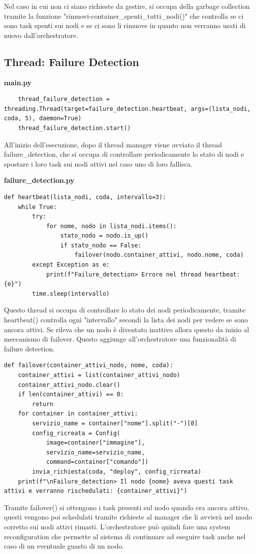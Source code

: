 \documentclass[12pt,a4paper]{article}
\begin{document}
Nel caso in cui non ci siano richieste da gestire, si occupa della garbage collection tramite la funzione "rimuovi-container\_spenti\_tutti\_nodi()" che controlla se ci sono task spenti sui nodi e se ci sono li rimuove in quanto non verranno usati di nuovo dall'orchestratore.
\subsection{Thread: Failure Detection}
\begin{center}
\textbf{main.py}
\end{center}
\begin{verbatim}
    thread_failure_detection = threading.Thread(target=failure_detection.heartbeat, args=(lista_nodi, coda, 5), daemon=True)
    thread_failure_detection.start()
\end{verbatim}
All'inizio dell'esecuzione, dopo il thread manager viene avviato il thread failure\_detection, che si occupa di controllare periodicamente lo stato di nodi e spostare i loro task sui nodi attivi nel caso uno di loro fallisca.
\begin{center}
\textbf{failure\_detection.py}
\end{center}
\begin{verbatim}
def heartbeat(lista_nodi, coda, intervallo=3):
    while True:
        try:
            for nome, nodo in lista_nodi.items():
                stato_nodo = nodo.is_up()
                if stato_nodo == False:
                    failover(nodo.container_attivi, nodo.nome, coda)
        except Exception as e:
            print(f"Failure_detection> Errore nel thread heartbeat: {e}")
        time.sleep(intervallo)    
\end{verbatim}
Questo thread si occupa di controllare lo stato dei nodi periodicamente, tramite heartbeat() controlla ogni "intervallo" secondi la lista dei nodi per vedere se sono ancora attivi. Se rileva che un nodo è diventato inattivo allora questo da inizio al meccanismo di failover. Questo aggiunge all'orchestratore una funzionalità di failure detection.
\begin{verbatim}
def failover(container_attivi_nodo, nome, coda):
    container_attivi = list(container_attivi_nodo)
    container_attivi_nodo.clear()
    if len(container_attivi) == 0:
        return
    for container in container_attivi:
        servizio_name = container["nome"].split("-")[0]
        config_ricreata = Config(
            image=container["immagine"],
            servizio_name=servizio_name,
            command=container["comando"])
        invia_richiesta(coda, "deploy", config_ricreata)
    print(f"\nFailure_detection> Il nodo {nome} aveva questi task attivi e verranno rischedulati: {container_attivi}")
\end{verbatim}
Tramite failover() si ottengono i task presenti sul nodo quando era ancora attivo, questi vengono poi schedulati tramite richieste al manager che li avvierà nel modo corretto sui nodi attivi rimasti. L'orchestratore può quindi fare una system reconfiguration che permette al sistema di continuare ad eseguire task anche nel caso di un eventuale guasto di un nodo.
\newpage
\end{document}
